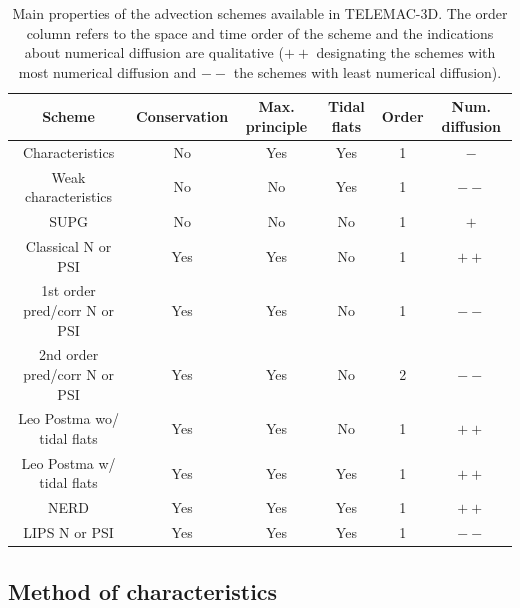 \begin{table}[ptbh]
\caption{Main properties of the advection schemes available in TELEMAC-3D. The order column refers to the space and time order of
the scheme and the indications about numerical diffusion are qualitative ($++$ designating the schemes with most numerical diffusion
and $--$ the schemes with least numerical diffusion).}%
\label{tab:advection_schemes}%
\centering
\begin{tabular}[c]{|c|c|c|c|c|c|}\hline
Scheme & Conservation & Max. principle & Tidal flats & Order & Num. diffusion  \\\hline 
Characteristics & No & Yes & Yes & 1 & $-$ \\
Weak characteristics & No & No & Yes & 1 & $--$ \\
SUPG & No & No & No & 1 & $+$ \\
Classical N or PSI & Yes & Yes & No & 1 & $++$ \\
1st order pred/corr N or PSI & Yes & Yes & No & 1 & $--$ \\
2nd order pred/corr N or PSI & Yes & Yes & No & 2 & $--$ \\
Leo Postma wo/ tidal flats & Yes & Yes & No & 1 & $++$ \\
Leo Postma w/ tidal flats & Yes & Yes & Yes & 1 & $++$ \\
NERD & Yes & Yes & Yes & 1 & $++$  \\
LIPS N or PSI & Yes & Yes & Yes & 1 & $--$ \\\hline 
\end{tabular}
\end{table}

\subsection{Method of characteristics}

